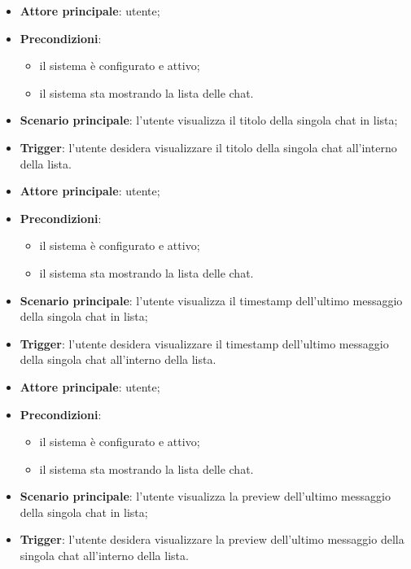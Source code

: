 \documentclass[10pt, a4paper]{article}
\begin{document}
    \begin{itemize}
        \item \textbf{Attore principale}: utente;
        \item \textbf{Precondizioni}:
            \begin{itemize}
                \item il sistema è configurato e attivo;
                \item il sistema sta mostrando la lista delle chat.
            \end{itemize}
        \item \textbf{Scenario principale}: l'utente visualizza il titolo della singola chat in lista;
        \item \textbf{Trigger}: l’utente desidera visualizzare il titolo della singola chat all’interno della lista.
    \end{itemize}

    \begin{itemize}
        \item \textbf{Attore principale}: utente;
        \item \textbf{Precondizioni}:
            \begin{itemize}
                \item il sistema è configurato e attivo;
                \item il sistema sta mostrando la lista delle chat.
            \end{itemize}
        \item \textbf{Scenario principale}: l'utente visualizza il timestamp dell'ultimo messaggio della singola chat in lista;
        \item \textbf{Trigger}: l’utente desidera visualizzare il timestamp dell'ultimo messaggio della singola chat all’interno della lista.
    \end{itemize}

    \begin{itemize}
        \item \textbf{Attore principale}: utente;
        \item \textbf{Precondizioni}:
            \begin{itemize}
                \item il sistema è configurato e attivo;
                \item il sistema sta mostrando la lista delle chat.
            \end{itemize}
        \item \textbf{Scenario principale}: l'utente visualizza la preview dell'ultimo messaggio della singola chat in lista;
        \item \textbf{Trigger}: l’utente desidera visualizzare la preview dell'ultimo messaggio della singola chat all’interno della lista.
    \end{itemize}
\end{document}
